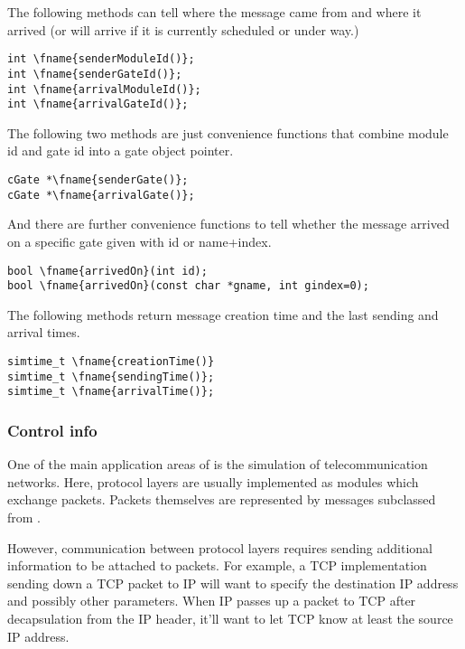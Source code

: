 The following methods can tell where the message came from and
where it arrived (or will arrive if it is currently scheduled or under way.)

\begin{Verbatim}[commandchars=\\\{\}]
int \fname{senderModuleId()};
int \fname{senderGateId()};
int \fname{arrivalModuleId()};
int \fname{arrivalGateId()};
\end{Verbatim}

The following two methods are just convenience functions that
combine module id and gate id into a gate object pointer.

\begin{Verbatim}[commandchars=\\\{\}]
cGate *\fname{senderGate()};
cGate *\fname{arrivalGate()};
\end{Verbatim}

And there are further convenience functions to tell whether
the message arrived on a specific gate given with id or
name+index.

\begin{Verbatim}[commandchars=\\\{\}]
bool \fname{arrivedOn}(int id);
bool \fname{arrivedOn}(const char *gname, int gindex=0);
\end{Verbatim}

The following methods return message creation time and the last sending
and arrival times.

\begin{Verbatim}[commandchars=\\\{\}]
simtime_t \fname{creationTime()}
simtime_t \fname{sendingTime()};
simtime_t \fname{arrivalTime()};
\end{Verbatim}

\subsubsection{Control info}

One of the main application areas of {\opp} is the simulation of
telecommunication networks. Here, protocol layers are usually
implemented as modules which exchange packets. Packets themselves
are represented by messages subclassed from .

However, communication between protocol layers requires sending
additional information to be attached to packets. For example,
a TCP implementation sending down a TCP packet to IP will want
to specify the destination IP address and possibly
other parameters. When IP passes up a packet to TCP after
decapsulation from the IP header, it'll want to let TCP know
at least the source IP address.

